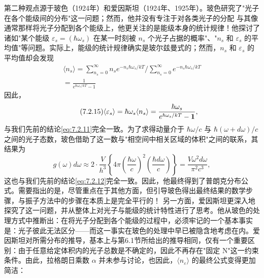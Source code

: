 第二种观点源于玻色（1924年）和爱因斯坦（1924年、1925年）。玻色研究了"光子在各个能级间的分布"这一问题；然而，他并没有专注于对各类光子的分配
与其像通常那样将光子分配到各个能级上，他更关注的是能级本身的统计规律！他探讨了诸如"某个能级 \(\varepsilon_{s}=(\hbar\omega_{s})\) 在某一时刻被 \(n_{s}\) 个光子占据的概率"、"\(n_{s}\) 和 \(\varepsilon_{s}\) 的平均值"等问题。实际上，能级的统计规律确实是玻尔兹曼式的；然而，\(n_{s}\) 和 \(\varepsilon_{s}\) 的平均值却会发现
\begin{equation}\tag{7.2.14}\label{eq:7.2.14}
\begin{array}{r} { \langle n _ { s } \rangle = \displaystyle \sum _ { n _ { s } = 0 } ^{\infty} n _ { s } e ^{- n _ { s} \hbar \omega _ { s } / k T } \Bigg / \displaystyle \sum _ { n _ { s } = 0 } ^{\infty} e ^{- n _ { s} \hbar \omega _ { s } / k T } } \\{ = \displaystyle \frac { 1 } { e ^{\hbar \omega _ { s} / k T } - 1 } } \end{array}
\end{equation}
因此，
\begin{equation}\tag{7.2.15}\label{eq:7.2.15}
\langle \varepsilon _ { s } \rangle = \hbar \omega _ { s } \langle n _ { s } \rangle = \frac { \hbar \omega _ { s } } { e ^{\hbar \omega _ { s} / k T } - { \bf 1 } } ,
\end{equation}
与我们先前的结论\autoref{eq:7.2.11}完全一致。为了求得动量介于 \(\hbar\omega/c\) 与 \(\hbar(\omega+d\omega)/c\) 之间的光子态数，玻色借助了这一数与"相空间中相关区域的体积"之间的联系，其结果为
\begin{equation}\tag{7.2.16}\label{eq:7.2.16}
g ( \omega ) d \omega \approx 2 \cdot \frac { V } { h ^{3} } \left\{ 4 \pi \left( \frac { \hbar \omega } { c } \right) ^{2} \left( \frac { \hbar d \omega } { c } \right) \right\} = \frac { V \omega ^{2} d \omega } { \pi ^{2} c ^{3} } ,
\end{equation}
这也与我们先前的结论\autoref{eq:7.2.12}完全一致。因此，他最终得到了普朗克分布公式。需要指出的是，尽管重点在于其他方面，但引导玻色得出最终结果的数学步骤，与振子方法中的步骤在本质上是完全平行的！
另一方面，爱因斯坦更深入地探究了这一问题，并从整体上对光子与能级的统计特性进行了思考。他从玻色的处理方式中推断出：在将光子分配到各个能级的过程中，必须牢记的一个基本事实是：光子彼此无法区分——而这一事实在玻色的处理中早已被隐含地考虑在内。爱因斯坦对所需分布的推导，基本上与第6.1节所给出的推导相同，仅有一个重要区别：由于任意给定体积内的光子总数是不确定的，因此不再存在"固定 N"这一约束条件。由此，拉格朗日乘数 \(\alpha\) 并未参与讨论，也因此，\(\langle n_{\varepsilon} \rangle\) 的最终公式变得更加简洁：
